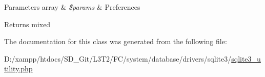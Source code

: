 \begin{DoxyParams}[1]{Parameters}
array & {\em \$params} & Preferences \\
\hline
\end{DoxyParams}
\begin{DoxyReturn}{Returns}
mixed 
\end{DoxyReturn}


The documentation for this class was generated from the following file\+:\begin{DoxyCompactItemize}
\item 
D\+:/xampp/htdocs/\+S\+D\+\_\+\+Git/\+L3\+T2/\+F\+C/system/database/drivers/sqlite3/\hyperlink{sqlite3__utility_8php}{sqlite3\+\_\+utility.\+php}\end{DoxyCompactItemize}
